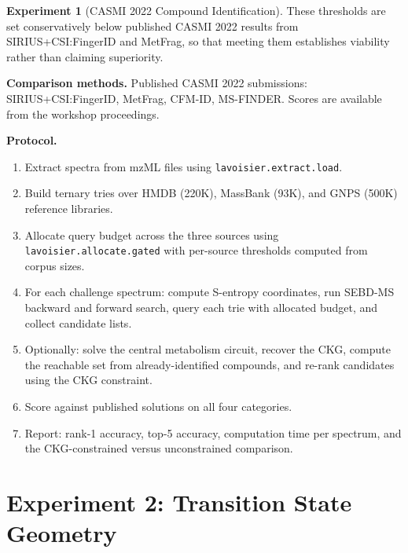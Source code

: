 \documentclass[11pt,a4paper]{article}
\theoremstyle{planstyle}
\theoremstyle{definition}
\newtheorem{experiment}[theorem]{Experiment}
\theoremstyle{remark}
\newcommand{\shk}[1]{\texttt{#1}}
\begin{document}
\begin{experiment}[CASMI 2022 Compound Identification]
These thresholds are set conservatively below published CASMI 2022
results from SIRIUS+CSI:FingerID and MetFrag, so that meeting them
establishes viability rather than claiming superiority.

\textbf{Comparison methods.} Published CASMI 2022 submissions:
SIRIUS+CSI:FingerID, MetFrag, CFM-ID, MS-FINDER. Scores are available
from the workshop proceedings.

\textbf{Protocol.}
\begin{enumerate}[nosep]
\item Extract spectra from mzML files using \shk{lavoisier.extract.load}.
\item Build ternary tries over HMDB (220K), MassBank (93K), and
  GNPS (500K) reference libraries.
\item Allocate query budget across the three sources using
  \shk{lavoisier.allocate.gated} with per-source thresholds computed
  from corpus sizes.
\item For each challenge spectrum: compute S-entropy coordinates,
  run SEBD-MS backward and forward search, query each trie with
  allocated budget, and collect candidate lists.
\item Optionally: solve the central metabolism circuit, recover the CKG,
  compute the reachable set from already-identified compounds, and
  re-rank candidates using the CKG constraint.
\item Score against published solutions on all four categories.
\item Report: rank-1 accuracy, top-5 accuracy, computation time per
  spectrum, and the CKG-constrained versus unconstrained comparison.
\end{enumerate}
\end{experiment}

\section{Experiment 2: Transition State Geometry}
\label{sec:exp-ts}
\end{document}
